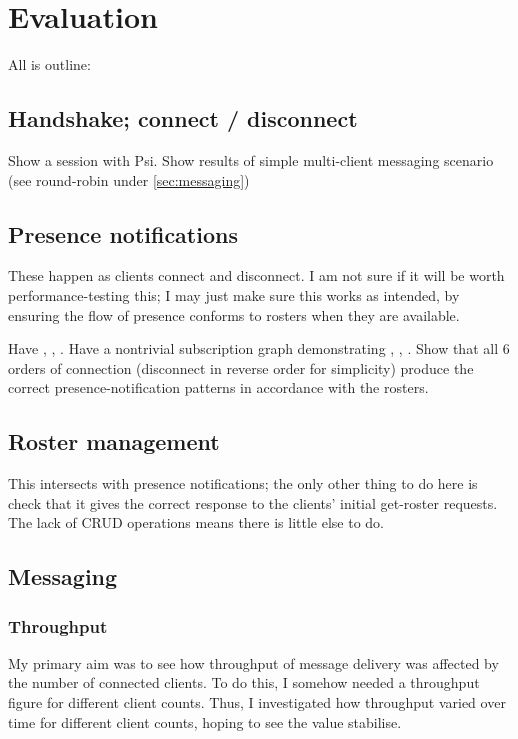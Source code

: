 \chapter{Evaluation}
All is outline:

\section{Handshake; connect / disconnect}
Show a session with Psi. Show results of simple multi-client messaging scenario (see round-robin under \ref{sec:messaging})

\section{Presence notifications}
These happen as clients connect and disconnect. I am not sure if it will be worth performance-testing this; I may just make sure this works as intended, by ensuring the flow of presence conforms to rosters when they are available.

Have , , . Have a nontrivial subscription graph demonstrating , , . Show that all 6 orders of connection (disconnect in reverse order for simplicity) produce the correct presence-notification patterns in accordance with the rosters.

\section{Roster management}
This intersects with presence notifications; the only other thing to do here is check that it gives the correct response to the clients' initial get-roster requests. The lack of CRUD operations means there is little else to do.

\section{Messaging}
\subsection{Throughput}
My primary aim was to see how throughput of message delivery was affected by the number of connected clients. To do this, I somehow needed a throughput figure for different client counts. Thus, I investigated how throughput varied over time for different client counts, hoping to see the value stabilise.

